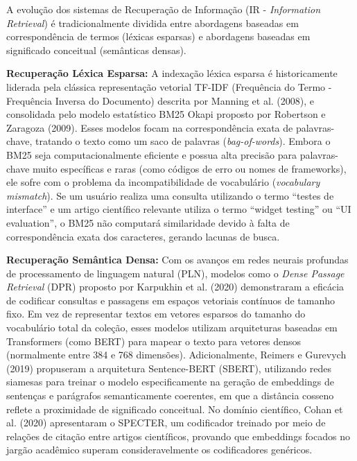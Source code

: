 \documentclass[12pt]{article}
\begin{document}
A evolução dos sistemas de Recuperação de Informação (IR - \textit{Information Retrieval}) é tradicionalmente dividida entre abordagens baseadas em correspondência de termos (léxicas esparsas) e abordagens baseadas em significado conceitual (semânticas densas).

\noindent\textbf{Recuperação Léxica Esparsa:} A indexação léxica esparsa é historicamente liderada pela clássica representação vetorial TF-IDF (Frequência do Termo - Frequência Inversa do Documento) descrita por Manning et al. (2008), e consolidada pelo modelo estatístico BM25 Okapi proposto por Robertson e Zaragoza (2009). Esses modelos focam na correspondência exata de palavras-chave, tratando o texto como um saco de palavras (\textit{bag-of-words}). Embora o BM25 seja computacionalmente eficiente e possua alta precisão para palavras-chave muito específicas e raras (como códigos de erro ou nomes de frameworks), ele sofre com o problema da incompatibilidade de vocabulário (\textit{vocabulary mismatch}). Se um usuário realiza uma consulta utilizando o termo ``testes de interface'' e um artigo científico relevante utiliza o termo ``widget testing'' ou ``UI evaluation'', o BM25 não computará similaridade devido à falta de correspondência exata dos caracteres, gerando lacunas de busca.

\noindent\textbf{Recuperação Semântica Densa:} Com os avanços em redes neurais profundas de processamento de linguagem natural (PLN), modelos como o \textit{Dense Passage Retrieval} (DPR) proposto por Karpukhin et al. (2020) demonstraram a eficácia de codificar consultas e passagens em espaços vetoriais contínuos de tamanho fixo. Em vez de representar textos em vetores esparsos do tamanho do vocabulário total da coleção, esses modelos utilizam arquiteturas baseadas em Transformers (como BERT) para mapear o texto para vetores densos (normalmente entre 384 e 768 dimensões). Adicionalmente, Reimers e Gurevych (2019) propuseram a arquitetura Sentence-BERT (SBERT), utilizando redes siamesas para treinar o modelo especificamente na geração de embeddings de sentenças e parágrafos semanticamente coerentes, em que a distância cosseno reflete a proximidade de significado conceitual. No domínio científico, Cohan et al. (2020) apresentaram o SPECTER, um codificador treinado por meio de relações de citação entre artigos científicos, provando que embeddings focados no jargão acadêmico superam consideravelmente os codificadores genéricos.
\end{document}
